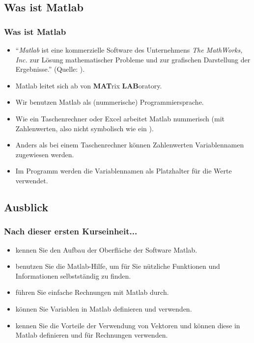     \subsection{Was ist Matlab}
    \begin{frame}
        \frametitle{Was ist Matlab}

        \begin{itemize}
          \item ``\emph{Matlab} ist eine kommerzielle Software des Unternehmens \emph{The MathWorks, Inc.} zur Lösung mathematischer Probleme
          und zur grafischen Darstellung der Ergebnisse.'' (Quelle: \href{https://de.wikipedia.org/wiki/Matlab}{}).
          \item Matlab leitet sich ab von \textbf{MAT}rix \textbf{LAB}oratory.
          \item Wir benutzen Matlab als (nummerische) Programmiersprache.
          \item Wie ein Taschenrechner oder Excel arbeitet Matlab nummerisch (mit Zahlenwerten, also nicht symbolisch wie
          ein \href{https://de.wikipedia.org/wiki/Computeralgebrasystem}{}).
          \item Anders als bei einem Taschenrechner können Zahlenwerten Variablennamen zugewiesen werden.
          \item Im Programm werden die Variablennamen als Platzhalter für die Werte verwendet.
        \end{itemize}
    \end{frame}

    \subsection{Ausblick}
    \begin{frame}
        \frametitle{Nach dieser ersten Kurseinheit...}

        \begin{itemize}
          \itemsep0.3cm
          \item kennen Sie den Aufbau der Oberfläche der Software Matlab.
          \item benutzen Sie die Matlab-Hilfe, um für Sie nützliche Funktionen und Informationen selbstständig zu finden.
          \item führen Sie einfache Rechnungen mit Matlab durch.
          \item können Sie Variablen in Matlab definieren und verwenden.
          \item kennen Sie die Vorteile der Verwendung von Vektoren und können diese in Matlab definieren und für Rechnungen verwenden.
        \end{itemize}
    \end{frame}

